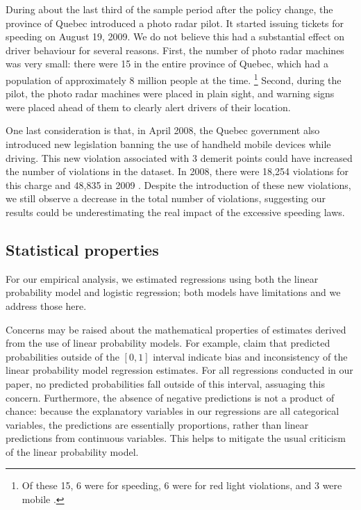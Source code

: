 During about the last third of the sample period after the policy change, 
the province of Quebec introduced a photo radar pilot. 
It started issuing tickets for speeding on August 19, 2009. 
We do not believe this had a substantial effect on driver behaviour for several reasons. 
First, the number of photo radar machines was very small: 
there were 15 in the entire province of Quebec, 
which had a population of approximately 8 million people at the time.%
\footnote{%
Of these 15, 6 were for speeding, 6 were for red light violations, and 3 were mobile 
\citep{bisson2020}.
}  
%
Second, during the pilot, 
the photo radar machines were placed in plain sight, 
and warning signs were placed ahead of them to clearly alert drivers of their location.

One last consideration is that, in April 2008, 
the Quebec government also introduced new legislation 
banning the use of handheld mobile devices while driving. 
This new violation associated with 3 demerit points could have 
increased the number of violations in the dataset. 
In 2008, there were 18,254 violations for this charge and 48,835 in 2009 
% 
\citep[table 1.3]{SAAQ2010}.
%  
Despite the introduction of these new violations, 
we still observe a decrease in the total number of violations, 
suggesting our results could be underestimating the real impact of the excessive speeding laws.



\subsection{Statistical properties}

For our empirical analysis, we estimated regressions using
both the linear probability model
and logistic regression; both models have limitations
and we address those here. 

Concerns may be raised about the mathematical properties of estimates 
derived from the use of linear probability models. 
For example, 
\citet{horraceoaxaca2006}
claim that predicted probabilities outside of the $[0,1]$ interval 
indicate bias and inconsistency of the linear probability model regression estimates. 
For all regressions conducted in our paper, 
no predicted probabilities fall outside of this interval, 
assuaging this concern. 
Furthermore, the absence of negative predictions is not a product of chance: 
because the explanatory variables in our regressions are all categorical variables, 
the predictions are essentially proportions, 
rather than linear predictions from continuous variables. 
This helps to mitigate the usual criticism of the linear probability model. 

